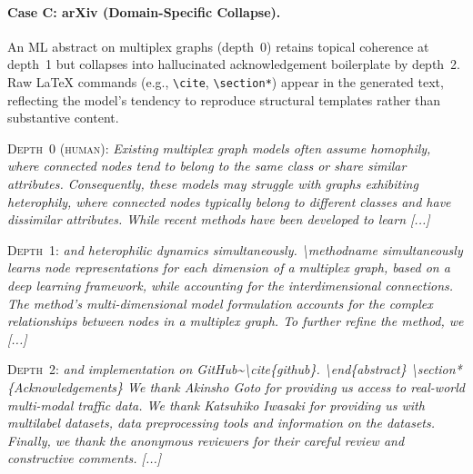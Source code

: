 \medskip

\paragraph{Case C: arXiv (Domain-Specific Collapse).}
An ML abstract on multiplex graphs (depth~0) retains topical coherence at depth~1 but collapses into hallucinated acknowledgement boilerplate by depth~2. Raw \LaTeX{} commands (e.g., \verb|\cite|, \verb|\section*|) appear in the generated text, reflecting the model's tendency to reproduce structural templates rather than substantive content.

\begin{center}
{\footnotesize
{}}
\end{center}

\noindent\textsc{Depth~0 (human):} {\small\itshape Existing multiplex graph models often assume homophily, where connected nodes tend to belong to the same class or share similar attributes. Consequently, these models may struggle with graphs exhibiting heterophily, where connected nodes typically belong to different classes and have dissimilar attributes. While recent methods have been developed to learn [...]}
\smallskip

\noindent\textsc{Depth~1:} {\small\itshape and heterophilic dynamics simultaneously. \textbackslash methodname simultaneously learns node representations for each dimension of a multiplex graph, based on a deep learning framework, while accounting for the interdimensional connections. The method's multi-dimensional model formulation accounts for the complex relationships between nodes in a multiplex graph. To further refine the method, we [...]}
\smallskip

\noindent\textsc{Depth~2:} {\small\itshape and implementation on GitHub\textasciitilde{}\textbackslash cite\{github\}. \textbackslash end\{abstract\} \textbackslash section*\{Acknowledgements\} We thank Akinsho Goto for providing us access to real-world multi-modal traffic data. We thank Katsuhiko Iwasaki for providing us with multilabel datasets, data preprocessing tools and information on the datasets. Finally, we thank the anonymous reviewers for their careful review and constructive comments. [...]}
\smallskip

